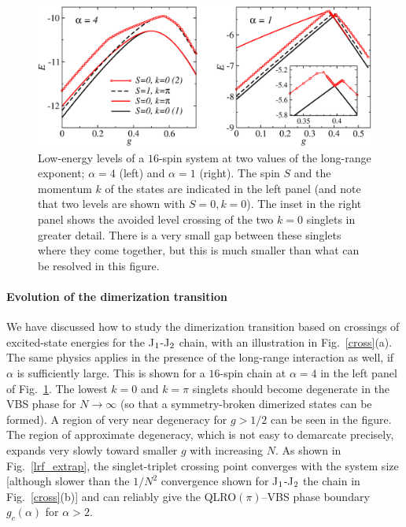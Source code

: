 \documentclass[draft,numberedheadings]{aipproc}
\begin{document}
\begin{figure}
\includegraphics[width=12.5cm, clip]{lrf_levels.eps}
\caption{Low-energy levels of a $16$-spin system at two values of the long-range exponent; $\alpha=4$ (left) and $\alpha=1$ (right). The spin $S$ 
and the momentum $k$ of the states are indicated in the left panel (and note that two levels are shown with $S=0,k=0$). The inset in the right panel shows 
the avoided level crossing of the two $k=0$ singlets in greater detail. There is a very small gap between these singlets where they come together, but 
this is much smaller than what can be resolved in this figure.}
\label{lrf_levels}
\end{figure}

\paragraph{Evolution of the dimerization transition}

We have discussed how to study the dimerization transition based on crossings of excited-state energies for the J$_{\rm 1}$-J$_{\rm 2}$ chain, with an 
illustration in Fig.~\ref{cross}(a). The same physics applies in the presence of the long-range interaction as well, if $\alpha$ is sufficiently 
large. This is shown for a  $16$-spin chain at $\alpha=4$ in the left panel of Fig.~\ref{lrf_levels}. The lowest $k=0$ and $k=\pi$ singlets should 
become degenerate in the VBS phase for $N \to \infty$ (so that a symmetry-broken dimerized states can be formed). A region of very near degeneracy for 
$g>1/2$ can be seen in the figure. The region of approximate degeneracy, which is not easy to demarcate precisely, expands very slowly toward smaller 
$g$ with increasing $N$. As shown in Fig.~\ref{lrf_extrap}, the singlet-triplet crossing point converges with the system size [although slower than 
the $1/N^2$ convergence shown for J$_{\rm 1}$-J$_{\rm 2}$ the chain in Fig.~\ref{cross}(b)] and can reliably give the QLRO$(\pi)$--VBS phase 
boundary $g_c(\alpha)$ for $\alpha > 2$.
\end{document}
